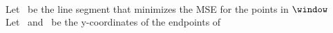 


\beginAlgorithm
{}
\encodeWindowSizee\\
Let \segment\ be the line segment that minimizes the MSE for the points in $\window$\\
Let \sO\ and \sN\ be the y-coordinates of the endpoints of \segment\\
\codeFloat{\sO}\\
\codeFloat{\sN}
